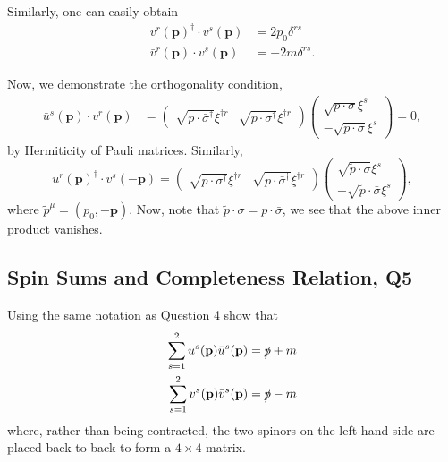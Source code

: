 \begin{solution}
    Similarly, one can easily obtain
    \begin{align}
    v^r(\mathbf{p})^\dagger\cdot v^s(\mathbf{p}) &= 2p_0\delta^{rs}\\
    \bar{v}^r(\mathbf{p})\cdot v^s(\mathbf{p}) &= -2m\delta^{rs}.
    \end{align}

    Now, we demonstrate the orthogonality condition,
    \begin{equation}
    \begin{aligned}
            \bar{u}^s(\mathbf{p})\cdot v^r(\mathbf{p})&=\begin{pmatrix}
         \sqrt{p\cdot\bar{\sigma}^\dagger}\xi^{\dagger r}&\sqrt{p\cdot \sigma^\dagger}\xi^{\dagger r}
     \end{pmatrix}
     \begin{pmatrix}
         \sqrt{p\cdot \sigma}\xi^s\\-\sqrt{p\cdot\bar{\sigma}}\xi^s
     \end{pmatrix}=0,
    \end{aligned}
    \end{equation}
    by Hermiticity of Pauli matrices. Similarly,
    \begin{equation}
        u^r(\mathbf{p})^\dagger\cdot v^s(-\mathbf{p}) = \begin{pmatrix}
         \sqrt{p\cdot \sigma^\dagger}\xi^{\dagger r}&\sqrt{p\cdot\bar{\sigma}^\dagger}\xi^{\dagger r}
     \end{pmatrix}
     \begin{pmatrix}
         \sqrt{ \tilde p\cdot \sigma}\xi^s\\-\sqrt{\tilde p\cdot\bar{\sigma}}\xi^s
     \end{pmatrix},
    \end{equation}
    where $\tilde p^\mu = (p_0,-\mathbf{p})$. Now, note that $\tilde p\cdot \sigma = p\cdot \bar\sigma$, we see that the above inner product vanishes.
\end{solution}

\subsection{Spin Sums and Completeness Relation, Q5}

Using the same notation as Question 4 show that
\begin{align}
    \sum_{s=1}^{2} u^s(\mathbf{p})\bar{u}^s(\mathbf{p}) &= \slashed{p} + m \label{eq:uouter}\\
    \sum_{s=1}^{2} v^s(\mathbf{p})\bar{v}^s(\mathbf{p}) &= \slashed{p} - m \label{eq:vouter}
\end{align}
where, rather than being contracted, the two spinors on the left-hand side are placed back to back to form a $4\times 4$ matrix.

